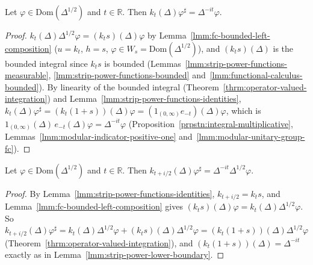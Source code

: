 \begin{lemma}[The Lower Edge: $k_t(\Delta)\varphi^\sharp = \Delta^{-it}\varphi$]
    \label{lmm:strip-power-lower-boundary}
    \leanok
    Let $\varphi \in \text{Dom}(\Delta^{1/2})$ and $t \in \mathbb{R}$. Then $k_t(\Delta)\varphi^\sharp = \Delta^{-it}\varphi$.
\end{lemma}
\begin{proof}
    \leanok
    $k_t(\Delta)\Delta^{1/2}\varphi = (k_ts)(\Delta)\varphi$ by Lemma~\ref{lmm:fc-bounded-left-composition} ($u = k_t$, $h = s$, $\varphi \in W_s = \text{Dom}(\Delta^{1/2})$), and $(k_ts)(\Delta)$ is the bounded integral since $k_ts$ is bounded (Lemmas~\ref{lmm:strip-power-functions-measurable}, \ref{lmm:strip-power-functions-bounded} and~\ref{lmm:functional-calculus-bounded}). By linearity of the bounded integral (Theorem~\ref{thrm:operator-valued-integration}) and Lemma~\ref{lmm:strip-power-functions-identities}, $k_t(\Delta)\varphi^\sharp = (k_t(1 + s))(\Delta)\varphi = (1_{(0,\infty)}e_{-t})(\Delta)\varphi$, which is $1_{(0,\infty)}(\Delta)\,e_{-t}(\Delta)\varphi = \Delta^{-it}\varphi$ (Proposition~\ref{prpstn:integral-multiplicative}, Lemmas~\ref{lmm:modular-indicator-positive-one} and~\ref{lmm:modular-unitary-group-fc}).
\end{proof}

\begin{lemma}[The Upper Edge: $k_{t+i/2}(\Delta)\varphi^\sharp = \Delta^{-it}\Delta^{1/2}\varphi$]
    \label{lmm:strip-power-upper-boundary}
    \leanok
    Let $\varphi \in \text{Dom}(\Delta^{1/2})$ and $t \in \mathbb{R}$. Then $k_{t + i/2}(\Delta)\varphi^\sharp = \Delta^{-it}\Delta^{1/2}\varphi$.
\end{lemma}
\begin{proof}
    \leanok
    By Lemma~\ref{lmm:strip-power-functions-identities}, $k_{t+i/2} = k_ts$, and Lemma~\ref{lmm:fc-bounded-left-composition} gives $(k_ts)(\Delta)\varphi = k_t(\Delta)\Delta^{1/2}\varphi$. So $k_{t+i/2}(\Delta)\varphi^\sharp = k_t(\Delta)\Delta^{1/2}\varphi + (k_ts)(\Delta)\Delta^{1/2}\varphi = (k_t(1 + s))(\Delta)\Delta^{1/2}\varphi$ (Theorem~\ref{thrm:operator-valued-integration}), and $(k_t(1 + s))(\Delta) = \Delta^{-it}$ exactly as in Lemma~\ref{lmm:strip-power-lower-boundary}.
\end{proof}

